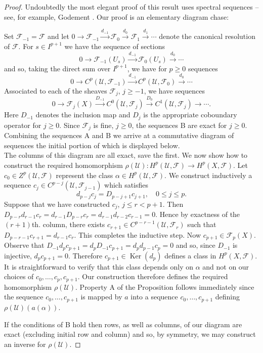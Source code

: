 \begin{proof}
Undoubtedly the most elegant proof of this result uses spectral sequences -- see, for example, Godement \cite{bib:II:godement-r:1}. Our proof is an elementary diagram chase:

Set $\mathcal F_{-1}=\mathcal F$ and let $0\to\mathcal F_{-1}\xrightarrow{d_{-1}}\mathcal F_0\xrightarrow{d_0}\mathcal F_1\xrightarrow{d_1}\cdots$ denote the canonical resolution of $\mathcal F$. For $s\in I^{p+1}$ we have the sequence of sections
\[
0\to\mathcal F_{-1}(U_s)\xrightarrow{d_{-1}}\mathcal F_0(U_s)\xrightarrow{d_0}\cdots
\]
and so, taking the direct sum over $I^{p+1}$, we have for $p\geq0$ sequences
\begin{equation}\tag{A}\label{eq:6:a:3}
0\to C^p(\mathcal U,\mathcal F_{-1})\xrightarrow{d_{-1}}C^p(\mathcal U,\mathcal F_0)\xrightarrow{d_0}\cdots
\end{equation}
Associated to each of the sheaves $\mathcal F_j$, $j\geq-1$, we have sequences
\begin{equation}\tag{B}\label{eq:6:b:2}
0\to\mathcal F_j(X)\xrightarrow{D_{-1}}C^0(\mathcal U,\mathcal F_j)\xrightarrow{D_0}C^1(\mathcal U,\mathcal F_j)\to\cdots.
\end{equation}
Here $D_{-1}$ denotes the inclusion map and $D_j$ is the appropriate coboundary operator for $j\geq0$. Since $\mathcal F_j$ is fine, $j\geq0$, the sequences B are exact for $j\geq0$. Combining the sequences A and B we arrive at a commutative diagram of sequences the initial portion of which is displayed below.
\[

\]
The columns of this diagram are all exact, save the first. We now show how to construct the required homomorphism $\rho(\mathcal U):H^p(\mathcal U,\mathcal F)\to H^p(X,\mathcal F)$. Let $c_0\in Z^p(\mathcal U,\mathcal F)$ represent the class $\alpha\in H^p(\mathcal U,\mathcal F)$. We construct inductively a sequence $c_j\in C^{p-j}(\mathcal U,\mathcal F_{j-1})$ which satisfies
\[
d_{p-j}c_j=D_{p-j+1}c_{j+1},\quad0\leq j\leq p.
\]
Suppose that we have constructed $c_j$, $j\leq r<p+1$. Then $D_{p-r}d_{r-1}c_r=d_{r-1}D_{p-r}c_r=d_{r-1}d_{r-2}c_{r-1}=0$. Hence by exactness of the $(r+1)$th. column, there exists $c_{r+1}\in C^{p-r-1}(\mathcal U,\mathcal F_r)$ such that $D_{p-r-1}c_{r+1}=d_{r-1}c_r$. This completes the inductive step. Now $c_{p+1}\in\mathcal F_p(X)$. Observe that $D_{-1}d_pc_{p+1}=d_pD_{-1}c_{p+1}=d_pd_{p-1}c_p=0$ and so, since $D_{-1}$ is injective, $d_pc_{p+1}=0$. Therefore $c_{p+1}\in\operatorname{Ker}(d_p)$ defines a class in $H^p(X,\mathcal F)$. It is straightforward to verify that this class depends only on $\alpha$ and not on our choices of $c_0,\ldots,c_p,c_{p+1}$. Our construction therefore defines the required homomorphism $\rho(\mathcal U)$.
Property A of the Proposition follows immediately since the sequence $c_0,\ldots,c_{p+1}$ is mapped by $a$ into a sequence $c_0,\ldots,c_{p+1}$ defining $\rho(\mathcal U)(a(\alpha))$.

If the conditions of B hold then rows, as well as columns, of our diagram are exact (excluding initial row and column) and so, by symmetry, we may construct an inverse for $\rho(\mathcal U)$.
\end{proof}
